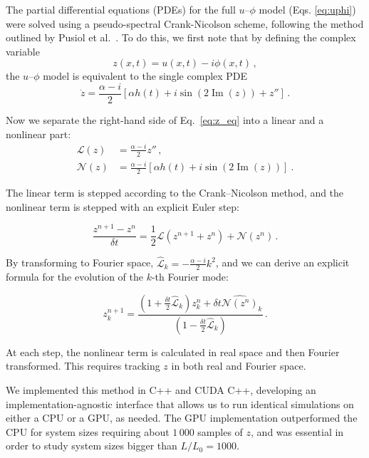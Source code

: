 \documentclass[prb,aps,twocolumn,superscriptaddress,floatfix]{revtex4-1}
\begin{document}
The partial differential equations (PDEs) for the full $u$--$\phi$ model (Eqs. \eqref{eq:uphi}) were solved using a pseudo-spectral Crank-Nicolson scheme, following the method outlined by Pusiol et al.~\cite{pusiol2026deterministic}. To do this, we first note that by defining the complex variable~\cite{skaugen2022}
\begin{equation}
    z(x,t)=u(x,t)-i\phi(x,t)\, ,
    \label{eq:z_def}
\end{equation}
the $u$--$\phi$ model is equivalent to the single complex PDE
\begin{equation}
    \dot z = \frac{\alpha-i}{2}[\alpha h(t) + i \sin\left(2\operatorname{Im}(z)\right)+z'']\, .
    \label{eq:z_eq}
\end{equation}

Now we separate the right-hand side of Eq.~\eqref{eq:z_eq} into a linear and a nonlinear part:
\begin{equation}
\begin{split}
    \mathcal L(z) &= \frac{\alpha-i}{2}z'' \, ,\\
    \mathcal{N}(z)&=\frac{\alpha-i}{2}[\alpha h(t)+i\sin\left(2\operatorname{Im}(z)\right)]\ .
\end{split}
    \label{eq:lin_nonlin}
\end{equation}

The linear term is stepped according to the Crank--Nicolson method, and the nonlinear term is stepped with an explicit Euler step:

\begin{equation}
\frac{z^{n+1}-z^{n}}{\delta t}=\frac 1 2 \mathcal L(z^{n+1}+z^{n})+\mathcal N(z^n)\, .
    \label{eq:stepping}
\end{equation}

By transforming to Fourier space, $\hat {\mathcal {L}}_k=-\frac{\alpha-i}{2}k^2$, and we can derive an explicit formula for the evolution of the $k$-th Fourier mode:

\begin{equation}
    z^{n+1}_k=\frac{\left(1+\frac{\delta t}{2}\hat{\mathcal L}_k\right)z_k^n+\delta t \widehat{\mathcal N(z^n)}_k}{\left( 1-\frac{\delta t} {2} \hat {\mathcal L}_k \right)} \, .
\end{equation}

At each step, the nonlinear term is calculated in real space and then Fourier transformed. This requires tracking $z$ in both real and Fourier space.


We implemented this method in C++ and CUDA C++, developing an implementation-agnostic interface that allows us to run identical simulations on either a CPU or a GPU, as needed. The GPU implementation outperformed the CPU for system sizes requiring about $1\,000$ samples of $z$, and was essential in order to study system sizes bigger than $L/L_0=1000$. 
\end{document}
